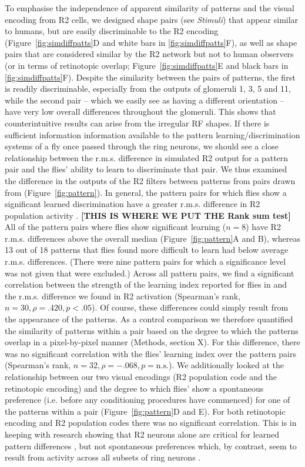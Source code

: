 \documentclass[10pt]{article}
\begin{document}
To emphasise the independence of apparent similarity of patterns and the visual encoding from R2 cells, we designed shape pairs (see \emph{Stimuli}) that appear similar to humans, but are easily discriminable to the R2 encoding (Figure~\ref{fig:simdiffpatts}D and white bars in \ref{fig:simdiffpatts}F), as well as shape pairs that are considered similar by the R2 network but not to human observers (or in terms of retinotopic overlap; Figure~\ref{fig:simdiffpatts}E and black bars in \ref{fig:simdiffpatts}F). Despite the similarity between the pairs of patterns, the first is readily discriminable, especially from the outputs of glomeruli 1, 3, 5 and 11, while the second pair – which we easily see as having a different orientation – have very low overall differences throughout the glomeruli. This shows that counterintuitive results can arise from the irregular RF shapes.
If there is sufficient information information available to the pattern learning/discrimination systems of a fly once passed through the ring neurons, we should see a close relationship between the r.m.s. difference in simulated R2 output for a pattern pair and the flies’ ability to learn to discriminate that pair. We thus examined the difference in the outputs of the R2 filters between patterns from pairs drawn from \cite{Ernst1999} (Figure~\ref{fig:pattern}). In general, the pattern pairs for which flies show a significant learned discrimination have a greater r.m.s. difference in R2 population activity \cite{Ernst1999}. {\bf [THIS IS WHERE WE PUT THE Rank sum test]} All of the pattern pairs where flies show significant learning ($n = 8$) have R2 r.m.s. differences above the overall median (Figure~\ref{fig:pattern}A and B), whereas 13 out of 18 patterns that flies found more difficult to learn had below average r.m.s. differences. (There were nine pattern pairs for which a significance level was not given that were excluded.) Across all pattern pairs, we find a significant correlation between the strength of the learning index reported for flies in \cite{Ernst1999} and the r.m.s. difference we found in R2 activation (Spearman’s rank, $n = 30, \rho = .420, p < .05$). 
Of course, these differences could simply result from the appearance of the patterns. As a control comparison we therefore quantified the similarity of patterns within a pair based on the degree to which the patterns overlap in a pixel-by-pixel manner (Methods, section X). For this difference, there was no significant correlation with the flies’ learning index over the pattern pairs (Spearman’s rank, $n = 32, \rho = -.068, p = \mathrm{n.s.}$). We additionally looked at the relationship between our two visual encodings (R2 population code and the retinotopic encoding) and the degree to which flies’ show a spontaneous preference (i.e. before any conditioning procedures have commenced) for one of the patterns within a pair (Figure~\ref{fig:pattern}D and E). For both retinotopic encoding and R2 population codes there was no significant correlation. This is in keeping with research showing that R2 neurons alone are critical for learned pattern differences \cite{Ernst1999}, but not spontaneous preferences which, by contrast, seem to result from activity across all subsets of ring neurons \cite{Solanki2015}.
\end{document}
